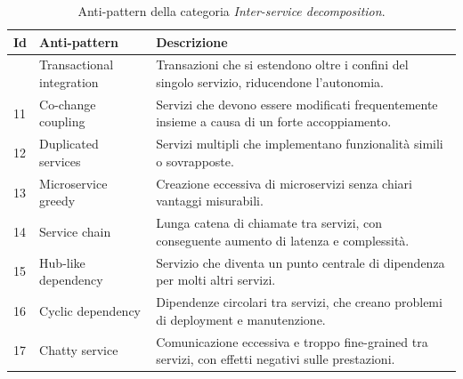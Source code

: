 \begin{table}[H]
\centering
\caption{Anti-pattern della categoria \textit{Inter-service decomposition}.}
\label{tab:inter_service_decomposition}
\small
\renewcommand{\arraystretch}{1.15}
\setlength{\tabcolsep}{7pt}

\begin{tabularx}{\textwidth}{
>{\centering\arraybackslash}p{0.8cm}
>{\RaggedRight\arraybackslash}p{3.8cm}
>{\RaggedRight\arraybackslash}X
}
\toprule
\textbf{Id} & \textbf{Anti-pattern} & \textbf{Descrizione} \\
\midrule

10 & Transactional integration
& Transazioni che si estendono oltre i confini del singolo servizio, riducendone l’autonomia. \\

\addlinespace[0.3em]

11 & Co-change coupling
& Servizi che devono essere modificati frequentemente insieme a causa di un forte accoppiamento. \\

\addlinespace[0.3em]

12 & Duplicated services
& Servizi multipli che implementano funzionalità simili o sovrapposte. \\

\addlinespace[0.3em]

13 & Microservice greedy
& Creazione eccessiva di microservizi senza chiari vantaggi misurabili. \\

\addlinespace[0.3em]

14 & Service chain
& Lunga catena di chiamate tra servizi, con conseguente aumento di latenza e complessità. \\

\addlinespace[0.3em]

15 & Hub-like dependency
& Servizio che diventa un punto centrale di dipendenza per molti altri servizi. \\

\addlinespace[0.3em]

16 & Cyclic dependency
& Dipendenze circolari tra servizi, che creano problemi di deployment e manutenzione. \\

\addlinespace[0.3em]

17 & Chatty service
& Comunicazione eccessiva e troppo fine-grained tra servizi, con effetti negativi sulle prestazioni. \\


\end{tabularx}
\end{table}
